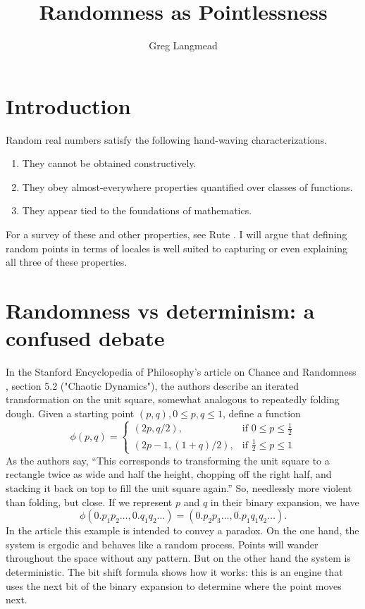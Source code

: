 \documentclass[14pt]{extarticle}
\title{Randomness as Pointlessness}
\author{Greg Langmead}
\begin{document}
\maketitle
\section{Introduction}
Random real numbers satisfy the following hand-waving characterizations.
\begin{enumerate}
\item They cannot be obtained constructively.
\item They obey almost-everywhere properties quantified over classes of functions.
\item They appear tied to the foundations of mathematics.
\end{enumerate}
For a survey of these and other properties, see Rute \cite{rute}. I will argue that defining random points in terms of locales is well suited to capturing or even explaining all three of these properties.
\section{Randomness vs determinism: a confused debate}
In the Stanford Encyclopedia of Philosophy's article on Chance and Randomness \cite{sep-chance-randomness}, section 5.2 ("Chaotic Dynamics"), the authors describe an iterated transformation on the unit square, somewhat analogous to repeatedly folding dough. Given a starting point $(p,q), 0\leq p, q\leq 1$, define a function
\[
\phi(p,q) =
 \begin{cases}
 (2p, q/2), & \text{if } 0 \le p \le \frac{1}{2} \\
 (2p-1,(1+q)/2), & \text{if } \frac{1}{2} \le p \le 1
 \end{cases}
 \]
As the authors say, ``This corresponds to transforming the unit square to a rectangle twice as wide and half the height, chopping off the right half, and stacking it back on top to fill the unit square again.'' So, needlessly more violent than folding, but close. If we represent $p$ and $q$ in their binary expansion, we have \[ \phi (0.p_1 p_2\ldots, 0.q_1 q_2\ldots) = (0.p_2 p_3\ldots , 0.p_1 q_1 q_2\ldots).\]
In the article this example is intended to convey a paradox. On the one hand, the system is ergodic and behaves like a random process. Points will wander throughout the space without any pattern. But on the other hand the system is deterministic. The bit shift formula shows how it works: this is an engine that uses the next bit of the binary expansion to determine where the point moves next.
\end{document}
